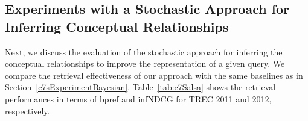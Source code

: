 \documentclass[1p]{elsarticle}
\begin{document}
\subsection{Experiments with a Stochastic Approach for Inferring Conceptual Relationships}\label{c7sExperimentRandomWalk}

Next, we discuss the evaluation of the stochastic approach for inferring the conceptual relationships to improve the representation of a given query. We compare the retrieval effectiveness of our approach with the same baselines as in Section~\ref{c7sExperimentBayesian}.
Table~\ref{tab:c7Salsa} shows the retrieval performances in terms of bpref and infNDCG for TREC 2011 and 2012, respectively.

\begin{table}[tb]
\caption{Retrieval performance of our stochastic approach for inferring relationships between medical concepts in comparison with the three baselines on TREC 2011 and 2012 Medical Records track's queries. Statistical significance (paired t-test) at $p<0.05$ over the task-specific representation and the Bo1 \& Semantic QE baselines are denoted $^t$ and $^{s}$, respectively.}\label{tab:c7Salsa}
  \centering
{}
\end{table}
\end{document}
